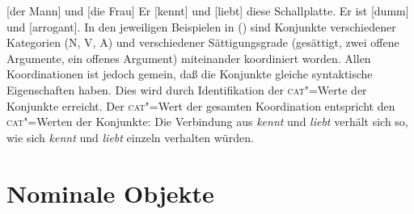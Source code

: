 \eal
\ex {}[der Mann] und [die Frau]
\ex Er [kennt] und [liebt] diese Schallplatte.
\ex Er ist [dumm] und [arrogant].
\zl
In den jeweiligen Beispielen in () sind Konjunkte verschiedener Kategorien (N, V, A) und 
verschiedener Sättigungsgrade (gesättigt,
zwei offene Argumente, ein offenes Argument) miteinander
koordiniert worden. Allen Koordinationen ist jedoch gemein, daß die Konjunkte gleiche syntaktische
Eigenschaften haben. Dies wird durch Identifikation der \textsc{cat}"=Werte der Konjunkte erreicht.
Der \textsc{cat}"=Wert der gesamten Koordination entspricht den \textsc{cat}"=Werten der Konjunkte:
Die Verbindung aus \emph{kennt} und \emph{liebt} verhält sich so, wie sich \emph{kennt} und \emph{liebt}
einzeln verhalten würden.


\section{Nominale Objekte}
\label{sec-index}

